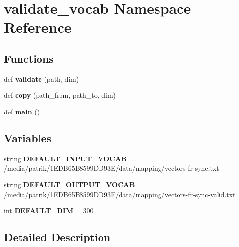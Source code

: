 \hypertarget{namespacevalidate__vocab}{}\section{validate\+\_\+vocab Namespace Reference}
\label{namespacevalidate__vocab}
\subsection*{Functions}
\begin{DoxyCompactItemize}
\item 
def {\bfseries validate} (path, dim)\hypertarget{namespacevalidate__vocab_a7cf4169d5d52c754e015d28f1b196b1d}{}\label{namespacevalidate__vocab_a7cf4169d5d52c754e015d28f1b196b1d}

\item 
def {\bfseries copy} (path\+\_\+from, path\+\_\+to, dim)\hypertarget{namespacevalidate__vocab_a9eef2a661555c154a615da5bed446f2d}{}\label{namespacevalidate__vocab_a9eef2a661555c154a615da5bed446f2d}

\item 
def {\bfseries main} ()\hypertarget{namespacevalidate__vocab_af1a150a4768343be222a6871adf4210d}{}\label{namespacevalidate__vocab_af1a150a4768343be222a6871adf4210d}

\end{DoxyCompactItemize}
\subsection*{Variables}
\begin{DoxyCompactItemize}
\item 
string {\bfseries D\+E\+F\+A\+U\+L\+T\+\_\+\+I\+N\+P\+U\+T\+\_\+\+V\+O\+C\+AB} = \textquotesingle{}/media/patrik/1\+E\+D\+B65\+B8599\+D\+D93\+E/data/mapping/vectors-\/fr-\/sync.\+txt\textquotesingle{}\hypertarget{namespacevalidate__vocab_ad5def56dd7f17d827c7937ccffb02e88}{}\label{namespacevalidate__vocab_ad5def56dd7f17d827c7937ccffb02e88}

\item 
string {\bfseries D\+E\+F\+A\+U\+L\+T\+\_\+\+O\+U\+T\+P\+U\+T\+\_\+\+V\+O\+C\+AB} = \textquotesingle{}/media/patrik/1\+E\+D\+B65\+B8599\+D\+D93\+E/data/mapping/vectors-\/fr-\/sync-\/valid.\+txt\textquotesingle{}\hypertarget{namespacevalidate__vocab_a666bf6f7027d67370ba537546650582f}{}\label{namespacevalidate__vocab_a666bf6f7027d67370ba537546650582f}

\item 
int {\bfseries D\+E\+F\+A\+U\+L\+T\+\_\+\+D\+IM} = 300\hypertarget{namespacevalidate__vocab_a8a13910fd47922e5f4b6f285b4c6aaa7}{}\label{namespacevalidate__vocab_a8a13910fd47922e5f4b6f285b4c6aaa7}

\end{DoxyCompactItemize}


\subsection{Detailed Description}
\begin{DoxyVerb}\end{DoxyVerb}
 